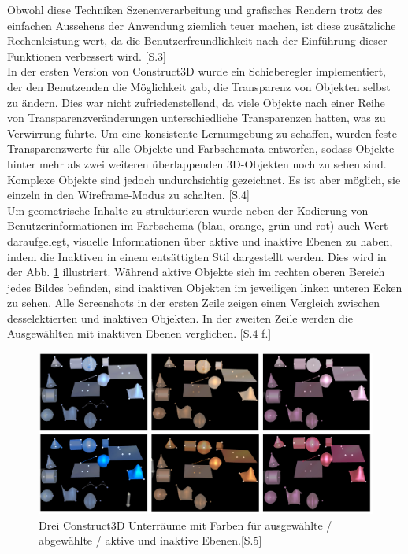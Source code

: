 \documentclass[deutsch]{llncs}
\begin{document}
Obwohl diese Techniken Szenenverarbeitung und grafisches Rendern trotz des einfachen Aussehens der Anwendung ziemlich teuer machen, 
ist diese zusätzliche Rechenleistung wert, da die Benutzerfreundlichkeit nach der Einführung dieser Funktionen verbessert wird. [S.3]\\
In der ersten Version von Construct3D wurde ein Schieberegler implementiert, der den Benutzenden die Möglichkeit gab, die Transparenz von 
Objekten selbst zu ändern. Dies war nicht zufriedenstellend, da viele Objekte nach einer Reihe von Transparenzveränderungen unterschiedliche 
Transparenzen hatten, was zu Verwirrung führte. Um eine konsistente Lernumgebung zu schaffen, wurden feste Transparenzwerte für alle Objekte und
 Farbschemata entworfen, sodass Objekte hinter mehr als zwei weiteren überlappenden 3D-Objekten noch zu sehen sind. Komplexe Objekte sind 
jedoch undurchsichtig gezeichnet. Es ist aber möglich, sie einzeln in den Wireframe-Modus zu schalten. [S.4]
\noindent \\
Um geometrische Inhalte zu strukturieren wurde neben der Kodierung von Benutzerinformationen im Farbschema (blau, orange, grün und rot) auch 
Wert daraufgelegt, visuelle Informationen über aktive und inaktive Ebenen zu haben, indem die Inaktiven in einem entsättigten Stil dargestellt werden. 
Dies wird in der Abb. \ref{Unterraeume} illustriert. Während aktive Objekte sich im rechten oberen Bereich jedes Bildes befinden, sind inaktiven Objekten im jeweiligen
 linken unteren Ecken zu sehen. Alle Screenshots in der ersten Zeile zeigen einen Vergleich zwischen desselektierten und inaktiven Objekten.
 In der zweiten Zeile werden die Ausgewählten mit inaktiven Ebenen verglichen. [S.4 f.]\\
\begin{figure}
\begin{center}
\includegraphics[scale=0.3]{Bilder/Unterraeume.PNG}
\caption{Drei Construct3D Unterräume mit Farben für ausgewählte / abgewählte / aktive und inaktive Ebenen.[S.5]}
\label{Unterraeume}
\end{center}
\end{figure}
\end{document}
